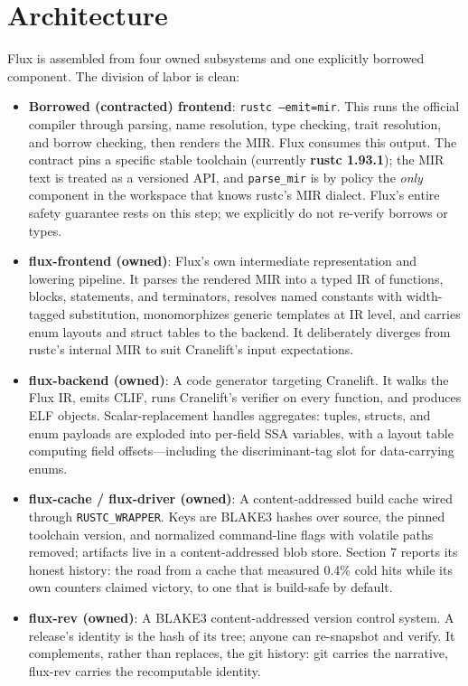 \section{Architecture}

Flux is assembled from four owned subsystems and one explicitly borrowed component. The division of labor is clean:

\begin{itemize}
\item \textbf{Borrowed (contracted) frontend}: \texttt{rustc --emit=mir}. This runs the official compiler through parsing, name resolution, type checking, trait resolution, and borrow checking, then renders the MIR. Flux consumes this output. The contract pins a specific stable toolchain (currently \textbf{rustc 1.93.1}); the MIR text is treated as a versioned API, and \texttt{parse\_mir} is by policy the \emph{only} component in the workspace that knows rustc's MIR dialect. Flux's entire safety guarantee rests on this step; we explicitly do not re-verify borrows or types.
\item \textbf{flux-frontend (owned)}: Flux's own intermediate representation and lowering pipeline. It parses the rendered MIR into a typed IR of functions, blocks, statements, and terminators, resolves named constants with width-tagged substitution, monomorphizes generic templates at IR level, and carries enum layouts and struct tables to the backend. It deliberately diverges from rustc's internal MIR to suit Cranelift's input expectations.
\item \textbf{flux-backend (owned)}: A code generator targeting Cranelift. It walks the Flux IR, emits CLIF, runs Cranelift's verifier on every function, and produces ELF objects. Scalar-replacement handles aggregates: tuples, structs, and enum payloads are exploded into per-field SSA variables, with a layout table computing field offsets---including the discriminant-tag slot for data-carrying enums.
\item \textbf{flux-cache / flux-driver (owned)}: A content-addressed build cache wired through \texttt{RUSTC\_WRAPPER}. Keys are BLAKE3 hashes over source, the pinned toolchain version, and normalized command-line flags with volatile paths removed; artifacts live in a content-addressed blob store. Section 7 reports its honest history: the road from a cache that measured 0.4\% cold hits while its own counters claimed victory, to one that is build-safe by default.
\item \textbf{flux-rev (owned)}: A BLAKE3 content-addressed version control system. A release's identity is the hash of its tree; anyone can re-snapshot and verify. It complements, rather than replaces, the git history: git carries the narrative, flux-rev carries the recomputable identity.
\end{itemize}

